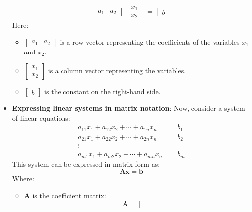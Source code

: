 \documentclass{report}
\begin{document}
\begin{itemize}
\[\begin{bmatrix}
                     a_1 & a_2
                 \end{bmatrix}
                 \begin{bmatrix}
                     x_1 \\
                     x_2
                 \end{bmatrix}
                 =
                 \begin{bmatrix}
                     b
                 \end{bmatrix}
             \]
             Here:
             \begin{itemize}
                 \item \(\begin{bmatrix} a_1 & a_2 \end{bmatrix}\) is a row vector representing the coefficients of the variables \(x_1\) and \(x_2\).
                 \item \(\begin{bmatrix} x_1 \\ x_2 \end{bmatrix}\) is a column vector representing the variables.
                 \item \(\begin{bmatrix} b \end{bmatrix}\) is the constant on the right-hand side.
             \end{itemize}
         \item \textbf{Expressing linear systems in matrix notation}:
             Now, consider a system of linear equations:
             \[
                 \begin{aligned}
                     a_{11}x_1 + a_{12}x_2 + \cdots + a_{1n}x_n &= b_1 \\
                     a_{21}x_1 + a_{22}x_2 + \cdots + a_{2n}x_n &= b_2 \\
                     \vdots \\
                     a_{m1}x_1 + a_{m2}x_2 + \cdots + a_{mn}x_n &= b_m
                 \end{aligned}
             \]
             This system can be expressed in matrix form as:
             \[
                 \mathbf{A}\mathbf{x} = \mathbf{b}
             \]
             Where:
             \begin{itemize}
                 \item \(\mathbf{A}\) is the coefficient matrix:
                     \[
                         \mathbf{A} = 
                         \begin{bmatrix}

\end{bmatrix}\]
\end{itemize}
\end{itemize}
\end{document}
